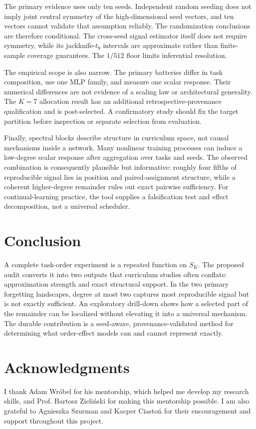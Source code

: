 \documentclass{article}
\begin{document}
The primary evidence uses only ten seeds. Independent random seeding does not imply joint central symmetry of the high-dimensional seed vectors, and ten vectors cannot validate that assumption reliably. The randomization conclusions are therefore conditional. The cross-seed signal estimator itself does not require symmetry, while its jackknife-$t_9$ intervals are approximate rather than finite-sample coverage guarantees. The $1/512$ floor limits inferential resolution.

The empirical scope is also narrow. The primary batteries differ in task composition, use one MLP family, and measure one scalar response. Their numerical differences are not evidence of a scaling law or architectural generality. The $K=7$ allocation result has an additional retrospective-provenance qualification and is post-selected. A confirmatory study should fix the target partition before inspection or separate selection from evaluation.

Finally, spectral blocks describe structure in curriculum space, not causal mechanisms inside a network. Many nonlinear training processes can induce a low-degree scalar response after aggregation over tasks and seeds. The observed combination is consequently plausible but informative: roughly four fifths of reproducible signal lies in position and paired-assignment structure, while a coherent higher-degree remainder rules out exact pairwise sufficiency. For continual-learning practice, the tool supplies a falsification test and effect decomposition, not a universal scheduler.

\section{Conclusion}

A complete task-order experiment is a repeated function on $S_K$. The proposed audit converts it into two outputs that curriculum studies often conflate: approximation strength and exact structural support. In the two primary forgetting landscapes, degree at most two captures most reproducible signal but is not exactly sufficient. An exploratory drill-down shows how a selected part of the remainder can be localized without elevating it into a universal mechanism. The durable contribution is a seed-aware, provenance-validated method for determining what order-effect models can and cannot represent exactly.

\section*{Acknowledgments}
I thank Adam Wróbel for his mentorship, which helped me develop my research skills, and Prof. Bartosz Zieli{\selectfont\'{n}}ski for making this mentorship possible. I am also grateful to Agnieszka Szurman and Kacper Ciasto{\selectfont\'{n}} for their encouragement and support throughout this project.
\end{document}
